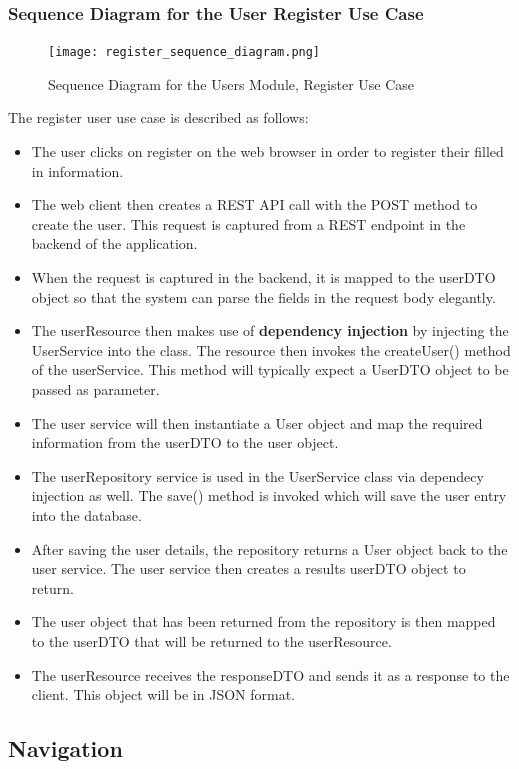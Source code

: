 \documentclass[runningheads,a4paper]{article}
\begin{document}
\subsubsection {Sequence Diagram for the User Register Use Case}
 	\begin{figure}[H]
   	\centering
   	\texttt{[image: register\_sequence\_diagram.png]}
   	\caption{Sequence Diagram for the Users Module, Register Use Case}
	\end{figure}
	
	The register user use case is described as follows: 
	\begin{itemize}
		\item The user clicks on register on the web browser in order to register their filled in information. 
		\item The web client then creates a REST API call with the POST method to create the user. This request is captured from a REST endpoint in the backend of the application.
		\item When the request is captured in the backend, it is mapped to the userDTO object so that the system can parse the fields in the request body elegantly. 
		\item The userResource then makes use of \textbf{dependency injection} by injecting the UserService into the class. The resource then invokes the createUser() method of the userService. This method will typically expect a UserDTO object to be passed as parameter.
		\item The user service will then instantiate a User object and map the required information from the userDTO to the user object. 
		\item The userRepository service is used in the UserService class via dependecy injection as well. The save() method is invoked which will save the user entry into the database. 
		\item After saving the user details, the repository returns a User object back to the user service. The user service then creates a results userDTO object to return. 
		\item The user object that has been returned from the repository is then mapped to the userDTO that will be returned to the userResource. 
		\item The userResource receives the responseDTO and sends it as a response to the client. This object will be in JSON format. 
	\end{itemize}

\subsection {Navigation}
\end{document}
